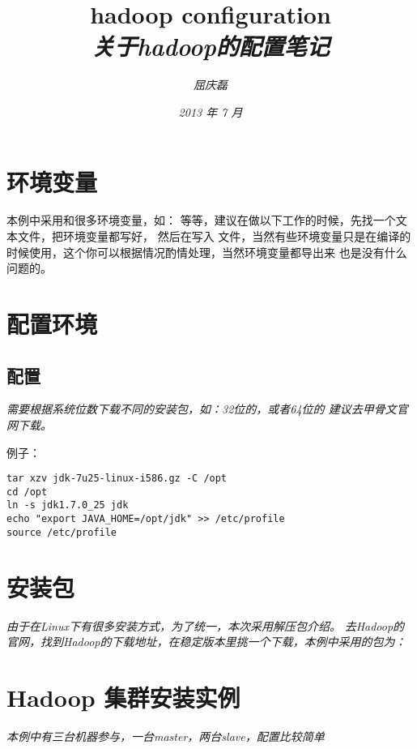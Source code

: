 \documentclass{article}
\begin{document}
\title{%
  {\huge \textsf{hadoop configuration}\\\smallskip}%
  {\small \textit{关于hadoop的配置笔记}}
}

\author{\textit{屈庆磊}\\[2mm]
       }

\date{\textit{2013 年 7 月}}

\maketitle
\begin{multicols}{2}
\tableofcontents
\end{multicols}

\section{环境变量}
本例中采用和很多环境变量，如： 等等，建议在做以下工作的时候，先找一个文本文件，把环境变量都写好，
然后在写入 文件，当然有些环境变量只是在编译的时候使用，这个你可以根据情况酌情处理，当然环境变量都导出来
也是没有什么问题的。

\section{配置环境}
\subsection{配置}
\textit{需要根据系统位数下载不同的安装包，如：32位的，或者64位的
建议去甲骨文官网下载。
}

\textsf{例子：}
\begin{verbatim}
tar xzv jdk-7u25-linux-i586.gz -C /opt
cd /opt
ln -s jdk1.7.0_25 jdk
echo "export JAVA_HOME=/opt/jdk" >> /etc/profile
source /etc/profile
\end{verbatim}

\section{安装包}
\textit{由于在Linux下有很多安装方式，为了统一，本次采用解压包介绍。}
\textit{去Hadoop的官网，找到Hadoop的下载地址，在稳定版本里挑一个下载，本例中采用的包为：}


\section{Hadoop 集群安装实例}
\textit{本例中有三台机器参与，一台master，两台slave，配置比较简单}
\end{document}
